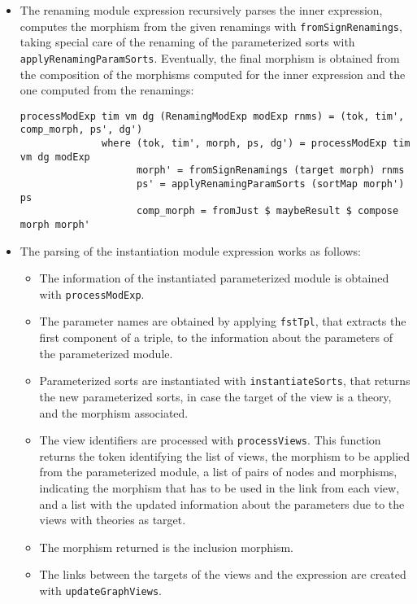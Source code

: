 \begin{itemize}
\item The renaming module expression recursively parses the inner expression, computes the morphism from the given renamings with \verb"fromSignRenamings",
taking special care of the renaming of the parameterized sorts with
\verb"applyRenamingParamSorts". Eventually, the final morphism is obtained
from the composition of the morphisms computed for the inner expression and
the one computed from the renamings:


{\codesize
\begin{verbatim}
processModExp tim vm dg (RenamingModExp modExp rnms) = (tok, tim', comp_morph, ps', dg')
              where (tok, tim', morph, ps, dg') = processModExp tim vm dg modExp
                    morph' = fromSignRenamings (target morph) rnms
                    ps' = applyRenamingParamSorts (sortMap morph') ps
                    comp_morph = fromJust $ maybeResult $ compose morph morph'
\end{verbatim}
}

\item The parsing of the instantiation module expression works as follows:

\begin{itemize}
\item The information of the instantiated parameterized module is obtained
with \verb"processModExp".
\item The parameter names are obtained by applying \verb"fstTpl", that
extracts the first component of a triple, to the information about the
parameters of the parameterized module.
\item Parameterized sorts are instantiated with \verb"instantiateSorts",
that returns the new parameterized sorts, in case the target of the view
is a theory, and the morphism associated.
\item The view identifiers are processed with \verb"processViews". This
function returns the token identifying the list of views, the morphism
to be applied from the parameterized module, a list of pairs of nodes
and morphisms, indicating the morphism that has to be used in the link
from each view, and a list with the updated information about the
parameters due to the views with theories as target.
\item The morphism returned is the inclusion morphism.
\item The links between the targets of the views and the expression
are created with \verb"updateGraphViews". 
\end{itemize}


\end{itemize}
